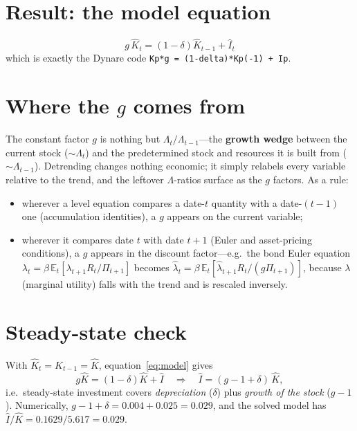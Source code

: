 \documentclass[11pt]{article}
\begin{document}
\section{Result: the model equation}

\begin{equation}\label{eq:model}
    \boxed{\,g\,\hat K_t = (1-\delta)\hat K_{t-1} + \hat I_t\,}
\end{equation}
which is exactly the Dynare code \texttt{Kp*g = (1-delta)*Kp(-1) + Ip}.

\section{Where the $g$ comes from}

The constant factor $g$ is nothing but $\Lambda_t/\Lambda_{t-1}$---the \textbf{growth wedge}
between the current stock ($\sim\Lambda_t$) and the predetermined stock and resources it
is built from ($\sim\Lambda_{t-1}$). Detrending changes nothing economic; it simply
relabels every variable relative to the trend, and the leftover $\Lambda$-ratios surface
as the $g$ factors. As a rule:
\begin{itemize}
    \item wherever a level equation compares a date-$t$ quantity with a date-$(t{-}1)$
          one (accumulation identities), a $g$ appears on the current variable;
    \item wherever it compares date $t$ with date $t{+}1$ (Euler and asset-pricing
          conditions), a $g$ appears in the discount factor---e.g.\ the bond Euler
          equation $\lambda_t = \beta\,\mathbb{E}_t[\lambda_{t+1}R_t/\Pi_{t+1}]$ becomes
          $\hat\lambda_t = \beta\,\mathbb{E}_t[\hat\lambda_{t+1}R_t/(g\Pi_{t+1})]$,
          because $\lambda$ (marginal utility) falls with the trend and is rescaled
          inversely.
\end{itemize}

\section{Steady-state check}

With $\hat K_t = \hat K_{t-1} = \hat K$, equation~\eqref{eq:model} gives
\begin{equation}
    g\hat K = (1-\delta)\hat K + \hat I
    \quad\Longrightarrow\quad
    \hat I = (g-1+\delta)\,\hat K,
\end{equation}
i.e.\ steady-state investment covers \emph{depreciation} ($\delta$) plus \emph{growth of
the stock} ($g-1$). Numerically, $g-1+\delta = 0.004 + 0.025 = 0.029$, and the solved
model has $\hat I/\hat K = 0.1629/5.617 = 0.029$. \checkmark
\end{document}

